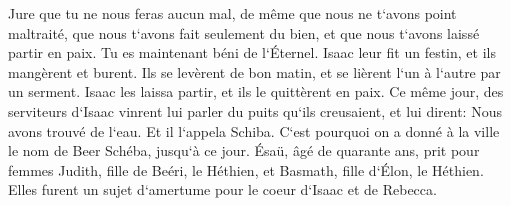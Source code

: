 \verse Jure que tu ne nous feras aucun mal, de même que nous ne t`avons point maltraité, que nous t`avons fait seulement du bien, et que nous t`avons laissé partir en paix. Tu es maintenant béni de l`Éternel. 
\verse Isaac leur fit un festin, et ils mangèrent et burent. 
\verse Ils se levèrent de bon matin, et se lièrent l`un à l`autre par un serment. Isaac les laissa partir, et ils le quittèrent en paix. 
\verse Ce même jour, des serviteurs d`Isaac vinrent lui parler du puits qu`ils creusaient, et lui dirent: Nous avons trouvé de l`eau. 
\verse Et il l`appela Schiba. C`est pourquoi on a donné à la ville le nom de Beer Schéba, jusqu`à ce jour. 
\verse Ésaü, âgé de quarante ans, prit pour femmes Judith, fille de Beéri, le Héthien, et Basmath, fille d`Élon, le Héthien. 
\verse Elles furent un sujet d`amertume pour le coeur d`Isaac et de Rebecca. 

